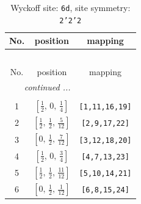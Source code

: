 \documentclass[fleqn,8pt]{jsarticle}
\begin{document}
\renewcommand{\arraystretch}{1.2}
\begin{longtable}{ccc}
\caption{Wyckoff site: {\tt 6d}, site symmetry: {\tt 2'2'2}}
 \\
 \hline \hline
No. & position & mapping \\ \hline \endfirsthead

\multicolumn{2}{l}{\tablename\ \thetable{}} \\
 \hline \hline
No. & position & mapping \\ \hline \endhead

 \hline \hline
\multicolumn{2}{r}{\footnotesize\it continued ...} \\ \endfoot

 \hline \hline
\multicolumn{2}{r}{} \\ \endlastfoot

1 & $\left[ \frac{1}{2},\, 0,\, \frac{1}{4} \right]$ & {\tt [1,11,16,19]} \\ \hline
2 & $\left[ \frac{1}{2},\, \frac{1}{2},\, \frac{5}{12} \right]$ & {\tt [2,9,17,22]} \\ \hline
3 & $\left[ 0,\, \frac{1}{2},\, \frac{7}{12} \right]$ & {\tt [3,12,18,20]} \\ \hline
4 & $\left[ \frac{1}{2},\, 0,\, \frac{3}{4} \right]$ & {\tt [4,7,13,23]} \\ \hline
5 & $\left[ \frac{1}{2},\, \frac{1}{2},\, \frac{11}{12} \right]$ & {\tt [5,10,14,21]} \\ \hline
6 & $\left[ 0,\, \frac{1}{2},\, \frac{1}{12} \right]$ & {\tt [6,8,15,24]} \\
\end{longtable}
\renewcommand{\arraystretch}{1.2}
\end{document}
